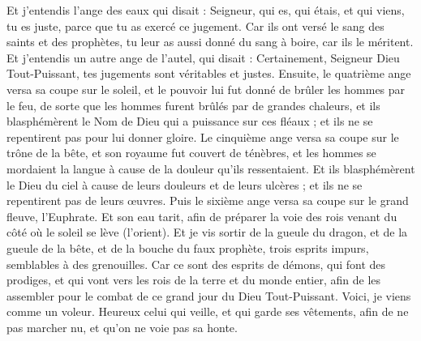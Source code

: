 \begin{multicols}{2}
Et j'entendis l'ange des eaux qui disait : Seigneur, qui es, qui étais, et qui viens, tu es juste, parce que tu as exercé ce jugement.
Car ils ont versé le sang des saints et des prophètes, tu leur as aussi donné du sang à boire, car ils le méritent.
Et j’entendis un autre ange de l’autel, qui disait : Certainement, Seigneur Dieu Tout-Puissant, tes jugements sont véritables et justes.
Ensuite, le quatrième ange versa sa coupe sur le soleil, et le pouvoir lui fut donné de brûler les hommes par le feu,
de sorte que les hommes furent brûlés par de grandes chaleurs, et ils blasphémèrent le Nom de Dieu qui a puissance sur ces fléaux ; et ils ne se repentirent pas pour lui donner gloire.
Le cinquième ange versa sa coupe sur le trône de la bête, et son royaume fut couvert de ténèbres, et les hommes se mordaient la langue à cause de la douleur qu'ils ressentaient.
Et ils blasphémèrent le Dieu du ciel à cause de leurs douleurs et de leurs ulcères ; et ils ne se repentirent pas de leurs œuvres.
Puis le sixième ange versa sa coupe sur le grand fleuve, l’Euphrate. Et son eau tarit, afin de préparer la voie des rois venant du côté où le soleil se lève (l’orient).
Et je vis sortir de la gueule du dragon, et de la gueule de la bête, et de la bouche du faux prophète, trois esprits impurs, semblables à des grenouilles.
Car ce sont des esprits de démons, qui font des prodiges, et qui vont vers les rois de la terre et du monde entier, afin de les assembler pour le combat de ce grand jour du Dieu Tout-Puissant.
Voici, je viens comme un voleur. Heureux celui qui veille, et qui garde ses vêtements, afin de ne pas marcher nu, et qu'on ne voie pas sa honte.

\end{multicols}
